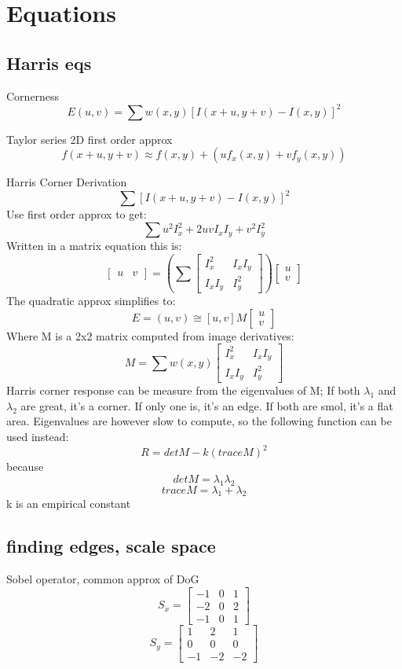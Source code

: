 \section{Equations}

\subsection{Harris eqs}
Cornerness
\[
E(u,v) = \sum w(x,y)[I(x+u,y+v)-I(x,y)]^2
\]

Taylor series 2D first order approx
\[
    f(x+u,y+v) \approx f(x,y)+(uf_x(x,y)+vf_y(x,y))
\]

Harris Corner Derivation
\[
    \sum [I(x+u,y+v)-I(x,y)]^2
\]
Use first order approx to get:
\[
    \sum u^2 I_x^2 + 2uvI_xI_y + v^2I_y^2
\]
Written in a matrix equation this is:
\[
    \begin{bmatrix}
        u & v
    \end{bmatrix}
    =
    (\sum
        \begin{bmatrix}
            I_x^2 & I_x I_y \\
            I_x I_y & I_y^2
        \end{bmatrix}
    )
    \begin{bmatrix}
        u \\
        v
    \end{bmatrix}
\]
The quadratic approx simplifies to:
\[
    E=(u,v) \cong [u,v] M
    \begin{bmatrix}
        u \\
        v
    \end{bmatrix}
\]
Where M is a 2x2 matrix computed from image derivatives:
\[
    M = \sum w(x,y)
    \begin{bmatrix}
        I_x^2 & I_xI_y \\
        I_xI_y & I_y^2
    \end{bmatrix}
\]
Harris corner response can be measure from the eigenvalues of M;
If both \(\lambda_1\) and \(\lambda_2\) are great, it's a corner. If only one
is, it's an edge. If both are smol, it's a flat area.
Eigenvalues are however slow to compute, so the following function can be used
instead:
\[
    R = det M - k(trace M)^2
\]
because
\[
    det M = \lambda_1 \lambda_2
\]
\[
    trace M = \lambda_1 + \lambda_2
\]
k is an empirical constant

\subsection{finding edges, scale space}
Sobel operator, common approx of DoG
\[
    S_x = 
    \begin{bmatrix}
        -1 & 0 & 1 \\
        -2 & 0 & 2 \\
        -1 & 0 & 1
    \end{bmatrix}
\]
\[
    S_y = 
    \begin{bmatrix}
        1 & 2 & 1 \\
        0 & 0 & 0 \\
        -1 & -2 & -2
    \end{bmatrix}
\]

